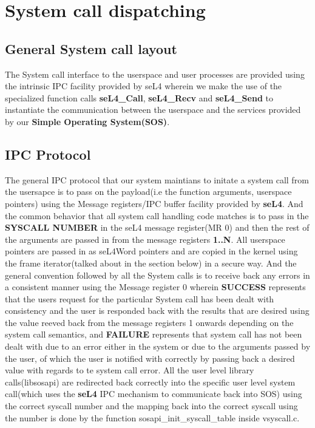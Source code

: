 
\section{System call dispatching}

\subsection{General System call layout}
The System call interface to the userspace and user processes are provided 
using the  intrinsic IPC facility provided by seL4 wherein we make the use 
of the specialized function calls \textbf{seL4\_Call}, \textbf{seL4\_Recv} and \textbf{seL4\_Send} 
to instantiate the communication between the userspace and the services
provided by our \textbf{Simple Operating System(SOS)}. \\

\subsection{IPC Protocol}
\noindent The general IPC protocol that our system maintians to initate a system call from the usersapce is to 
pass on the payload(i.e the function arguments, userspace pointers) using the Message registers/IPC buffer 
facility provided by \textbf{seL4}. And the common behavior that all system call handling code matches is to pass 
in the \textbf{SYSCALL NUMBER} in the seL4 message register(MR 0) and then the rest of the 
arguments are passed in from the message registers \textbf{1..N}. All userspace pointers are passed in as seL4Word 
pointers and are copied in the kernel using the frame iterator(talked about in the section below) in a secure way.
And the general convention followed by all the System calls is to receive back any errors in a consistent manner using the 
Message register 0 wherein \textbf{SUCCESS} represents that the users request for the particular System call has been dealt 
with consistency and the user is responded back with the results that are desired using the value reeved back from the message 
registers 1 onwards depending on the system call semantics, and \textbf{FAILURE} represents that system call has not been 
dealt with due to an error either in the system or due to the arguments passed by the user, of which the user is notified with 
correctly by passing back a desired value with regards to te system call error. All the user level library calls(libsosapi) are 
redirected back correctly into the specific user level system call(which uses the \textbf{seL4} IPC mechanism to communicate back into SOS) using the 
correct syscall number and the mapping back into the correct syscall using the number is done by the function sosapi\_init\_syscall\_table inside 
vsyscall.c. \\

